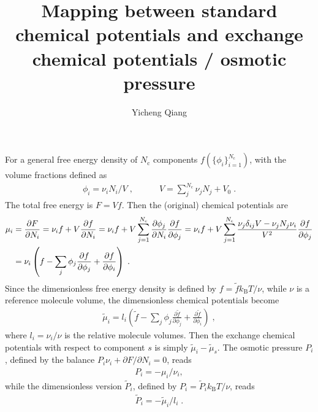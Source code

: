 \documentclass[reprint,onecolumn,groupedaddress,amsmath,amssymb]{revtex4-2}
\begin{document}
\title{Mapping between standard chemical potentials and exchange chemical potentials / osmotic pressure}

\author{Yicheng Qiang}

\maketitle
\tableofcontents

For a general free energy density of $N_\mathrm{c}$ components $f(\{\phi_i\}_{i=1}^{N_\mathrm{c}})$, with the volume fractions defined as
\begin{align}
    \phi_i = \nu_i  N_i / V\;, \quad \quad \quad V = \sum_j^{N_\mathrm{c}} \nu_j N_j + V_0 \;.
\end{align}
The total free energy is $F = V f$.
Then the (original) chemical potentials are
\begin{align}
    \mu_i 
    &= \frac{\partial F}{\partial N_i}
    = \nu_i f + V \frac{\partial f}{\partial N_i}
    = \nu_i f + V \sum_{j=1}^{N_\mathrm{c}} \frac{\partial \phi_j}{\partial N_i} \frac{\partial f}{\partial \phi_j}
    = \nu_i f + V \sum_{j=1}^{N_\mathrm{c}} \frac{\nu_j \delta_{ij} V - \nu_j N_j \nu_i}{V^2} \frac{\partial f}{\partial \phi_j} \notag \\
    &= \nu_i \left( f - \sum_j \phi_j \frac{\partial f}{\partial \phi_j} + \frac{\partial f}{\partial \phi_i} \right) \;.
\end{align}
Since the dimensionless free energy density is defined by $f = \tilde{f} k_\mathrm{B} T / \nu$, while $\nu$ is a reference molecule volume, the dimensionless chemical potentials become
\begin{align}
    \tilde{\mu}_i = l_i \left(\tilde{f} - \sum_j \phi_j \frac{\partial \tilde{f}}{\partial \phi_j} + \frac{\partial \tilde{f}}{\partial \phi_i} \right) \;,
\end{align} 
where $l_i = \nu_i / \nu$ is the relative molecule volumes.
Then the exchange chemical potentials with respect to component $s$ is simply $\tilde{\mu}_i - \tilde{\mu}_s$.
The osmotic pressure $P_i$, defined by the balance $P_i \nu_i + \partial F/\partial N_i = 0$, reads
\begin{align}
    P_i = - \mu_i / \nu_i, 
\end{align} 
while the dimensionless version $\tilde{P}_i$, defined by $P_i = \tilde{P}_i k_\mathrm{B} T / \nu$, reads
\begin{align}
    \tilde{P}_i = - \tilde{\mu}_i / l_i \;.
\end{align}
\end{document}
